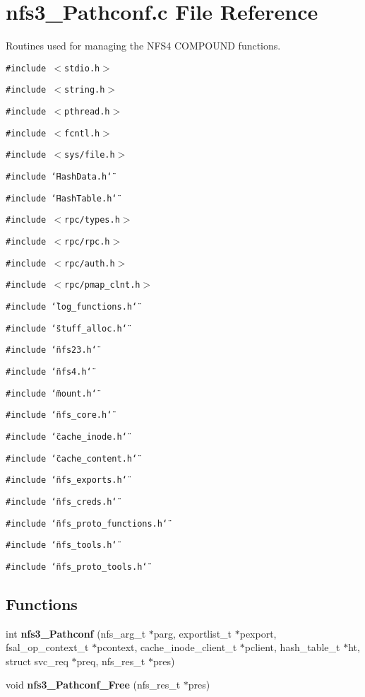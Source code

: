 \section{nfs3\_\-Pathconf.c File Reference}
\label{nfs3__Pathconf_8c}
Routines used for managing the NFS4 COMPOUND functions. 

{\tt \#include $<$stdio.h$>$}\par
{\tt \#include $<$string.h$>$}\par
{\tt \#include $<$pthread.h$>$}\par
{\tt \#include $<$fcntl.h$>$}\par
{\tt \#include $<$sys/file.h$>$}\par
{\tt \#include \char`\"{}Hash\-Data.h\char`\"{}}\par
{\tt \#include \char`\"{}Hash\-Table.h\char`\"{}}\par
{\tt \#include $<$rpc/types.h$>$}\par
{\tt \#include $<$rpc/rpc.h$>$}\par
{\tt \#include $<$rpc/auth.h$>$}\par
{\tt \#include $<$rpc/pmap\_\-clnt.h$>$}\par
{\tt \#include \char`\"{}log\_\-functions.h\char`\"{}}\par
{\tt \#include \char`\"{}stuff\_\-alloc.h\char`\"{}}\par
{\tt \#include \char`\"{}nfs23.h\char`\"{}}\par
{\tt \#include \char`\"{}nfs4.h\char`\"{}}\par
{\tt \#include \char`\"{}mount.h\char`\"{}}\par
{\tt \#include \char`\"{}nfs\_\-core.h\char`\"{}}\par
{\tt \#include \char`\"{}cache\_\-inode.h\char`\"{}}\par
{\tt \#include \char`\"{}cache\_\-content.h\char`\"{}}\par
{\tt \#include \char`\"{}nfs\_\-exports.h\char`\"{}}\par
{\tt \#include \char`\"{}nfs\_\-creds.h\char`\"{}}\par
{\tt \#include \char`\"{}nfs\_\-proto\_\-functions.h\char`\"{}}\par
{\tt \#include \char`\"{}nfs\_\-tools.h\char`\"{}}\par
{\tt \#include \char`\"{}nfs\_\-proto\_\-tools.h\char`\"{}}\par
\subsection*{Functions}
\begin{CompactItemize}
\item 
int {\bf nfs3\_\-Pathconf} (nfs\_\-arg\_\-t $\ast$parg, exportlist\_\-t $\ast$pexport, fsal\_\-op\_\-context\_\-t $\ast$pcontext, cache\_\-inode\_\-client\_\-t $\ast$pclient, hash\_\-table\_\-t $\ast$ht, struct svc\_\-req $\ast$preq, nfs\_\-res\_\-t $\ast$pres)
\item 
void {\bf nfs3\_\-Pathconf\_\-Free} (nfs\_\-res\_\-t $\ast$pres)
\end{CompactItemize}


